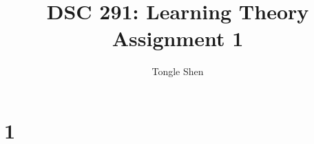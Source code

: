 \documentclass{article}
\title{DSC 291: Learning Theory Assignment 1}
\author{Tongle Shen}
\begin{document}
\maketitle

\section{1}








\end{document}
